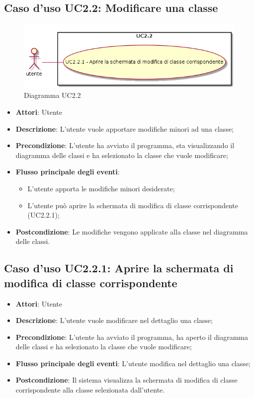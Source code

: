 \documentclass[../AnalisiDeiRequisiti.tex]{subfiles}
\begin{document}
	\subsection{Caso d'uso UC2.2: Modificare una classe}
	\begin{figure} [H]
		\centering
		\includegraphics[scale=0.45]{./Figures/UC2_2.png}
		\caption{Diagramma UC2.2}\label{}
	\end{figure}
	\begin{itemize}
		\item \textbf{Attori}: Utente
		\item \textbf{Descrizione}: L'utente vuole apportare modifiche minori ad una classe;
		\item \textbf{Precondizione}: L'utente ha avviato il programma, sta visualizzando il diagramma delle classi e ha selezionato la classe che vuole modificare;
		\item \textbf{Flusso principale degli eventi}: \begin{itemize}
			\item L'utente apporta le modifiche minori desiderate;
			\item L'utente può aprire la schermata di modifica di classe corrispondente (UC2.2.1);
		\end{itemize}
		\item \textbf{Postcondizione}: Le modifiche vengono applicate alla classe nel diagramma delle classi.
	\end{itemize}
	\subsection{Caso d'uso UC2.2.1: Aprire la schermata di modifica di classe corrispondente}
	\begin{itemize}
		\item \textbf{Attori}: Utente
		\item \textbf{Descrizione}: L'utente vuole modificare nel dettaglio una classe;
		\item \textbf{Precondizione}: L'utente ha avviato il programma, ha aperto il diagramma delle classi e ha selezionato la classe che vuole modificare;
		\item \textbf{Flusso principale degli eventi}: L'utente modifica nel dettaglio una classe;
		\item \textbf{Postcondizione}: Il sistema visualizza la schermata di modifica di classe corrispondente alla classe selezionata dall'utente.
	\end{itemize}
\end{document}

